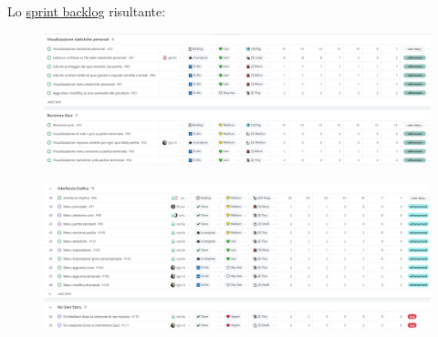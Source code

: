
Lo \href{https://github.com/orgs/ISIQuiz/projects/3/views/19}{sprint backlog} risultante:

\begin{figure}[H]
    \centering
    \includegraphics[width=\textwidth]{process/Img/Sprint8BL1.png}
    \label{fig:Sprint8BL1}
\end{figure}

\begin{figure}[H]
    \centering
    \includegraphics[width=\textwidth]{process/Img/Sprint8BL2.png}
    \label{fig:Sprint8BL2}
\end{figure}
